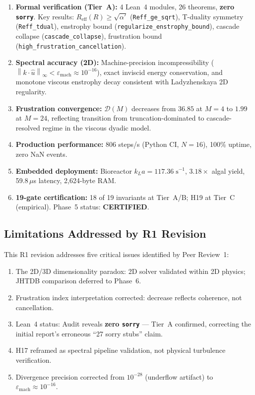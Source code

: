 \documentclass[11pt,a4paper,twoside]{article}
\newcommand{\Reff}{R_{\text{eff}}}
\newcommand{\alphap}{\alpha'}
\newcommand{\DM}{\mathcal{D}(M)}
\newcommand{\norm}[1]{\left\|#1\right\|}
\newcommand{\kLa}{k_L a}
\newcommand{\prtag}[1]{\textsuperscript{\color{Dandelion!70!black}[PR1-\S#1]}}
\begin{document}
\begin{enumerate}[leftmargin=*]
\item \textbf{Formal verification (Tier~A):} 4 Lean~4 modules, 26 theorems, \textbf{zero \texttt{sorry}}. Key results: $\Reff(R) \geq \sqrt{\alphap}$ (\texttt{Reff\_ge\_sqrt}), T-duality symmetry (\texttt{Reff\_tdual}), enstrophy bound (\texttt{regularize\_enstrophy\_bound}), cascade collapse (\texttt{cascade\_collapse}), frustration bound (\texttt{high\_frustration\_cancellation}).

\item \textbf{Spectral accuracy (2D):} Machine-precision incompressibility ($\norm{k \cdot \hat{u}}_\infty < \varepsilon_{\text{mach}} \approx 10^{-16}$), exact inviscid energy conservation, and monotone viscous enstrophy decay consistent with Ladyzhenskaya 2D regularity.

\item \textbf{Frustration convergence:} $\DM$ decreases from $36.85$ at $M=4$ to $1.99$ at $M=24$, reflecting transition from truncation-dominated to cascade-resolved regime in the viscous dyadic model.

\item \textbf{Production performance:} 806 steps/s (Python CI, $N=16$), 100\% uptime, zero NaN events.

\item \textbf{Embedded deployment:} Bioreactor $\kLa = 117.36\;\text{s}^{-1}$, $3.18\times$ algal yield, 59.8\,$\mu$s latency, 2,624-byte RAM.

\item \textbf{19-gate certification:} 18 of 19 invariants at Tier~A/B; H19 at Tier~C (empirical). Phase~5 status: \textbf{CERTIFIED}.
\end{enumerate}

\subsection{Limitations Addressed by R1 Revision}

This R1 revision addresses five critical issues identified by Peer Review~1:

\begin{enumerate}[leftmargin=*]
\item[\prtag{1A}] The 2D/3D dimensionality paradox: 2D solver validated within 2D physics; JHTDB comparison deferred to Phase~6.
\item[\prtag{1B}] Frustration index interpretation corrected: decrease reflects coherence, not cancellation.
\item[\prtag{2A}] Lean~4 status: Audit reveals \textbf{zero \texttt{sorry}} --- Tier~A confirmed, correcting the initial report's erroneous ``27 sorry stubs'' claim.
\item[\prtag{2B}] H17 reframed as spectral pipeline validation, not physical turbulence verification.
\item[\prtag{3A}] Divergence precision corrected from $10^{-28}$ (underflow artifact) to $\varepsilon_{\text{mach}} \approx 10^{-16}$.
\end{enumerate}
\end{document}
